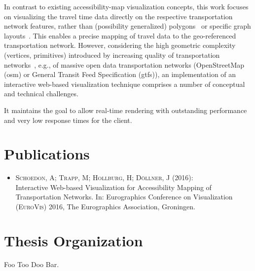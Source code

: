     In contrast to existing accessibility-map visualization concepts, this work
    focuses on visualizing the travel time data directly on the respective
    transportation network features, rather than (possibility generalized)
    polygons~\cite{Glander2010} or specific graph layouts~\cite{Krause2012}.
    This enables a precise mapping of travel data to the geo-referenced
    transportation network. However, considering the high geometric complexity
    (vertices, primitives) introduced by increasing quality of transportation
    networks~\cite{Zielstra2010}, e.g., of massive open data transportation
    networks (OpenStreetMap (\acrshort{osm}) or General Transit Feed
    Specification (\acrshort{gtfs})),
    an implementation of an interactive web-based visualization technique
    comprises a number of conceptual and technical challenges.\par

    It maintains the goal to allow real-time rendering with outstanding
    performance and very low response times for the client.\par


  \section{Publications}
    \label{sec:intro:publc}
    \begin{itemize}
      \item \cite{STHD2016} \textsc{Schoedon, A; Trapp, M; Hollburg, H; Döllner, J (2016)}:\\ Interactive Web-based Visualization for Accessibility Mapping of Transportation Networks. In: Eurographics Conference on Visualization (\textsc{EuroVis}) 2016, The Eurographics Association, Groningen.
    \end{itemize}

  \section{Thesis Organization}
    \label{sec:intro:organ}
    Foo Too Doo Bar.
